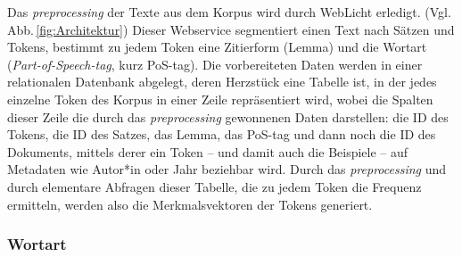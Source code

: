 \documentclass{article}
\newcommand*{\englisch}[1]{\foreignlanguage{english}{\textit{#1}}}%
\begin{document}
Das \englisch{preprocessing} der Texte aus dem Korpus wird durch
WebLicht erledigt. (Vgl. Abb.\,\ref{fig:Architektur}) Dieser
Webservice segmentiert einen Text nach Sätzen und Tokens, bestimmt zu
jedem Token eine Zitierform (Lemma) und die Wortart
(\englisch{Part-of-Speech-tag}, kurz PoS-tag). Die vorbereiteten Daten
werden in einer relationalen Datenbank abgelegt, deren Herzstück eine
Tabelle ist, in der jedes einzelne Token des Korpus in einer Zeile
repräsentiert wird, wobei die Spalten dieser Zeile die durch das
\englisch{preprocessing} gewonnenen Daten darstellen: die ID des
Tokens, die ID des Satzes, das Lemma, das PoS-tag und dann noch die ID
des Dokuments, mittels derer ein Token -- und damit auch die Beispiele
-- auf Metadaten wie Autor*in oder Jahr beziehbar wird. Durch das
\englisch{preprocessing} und durch elementare Abfragen dieser Tabelle,
die zu jedem Token die Frequenz ermitteln, werden also die
Merkmalsvektoren der Tokens generiert.


\subsubsection{Wortart}




\printbibliography


\end{document}
